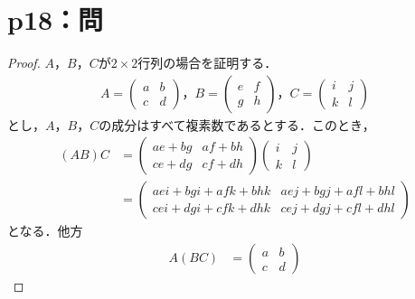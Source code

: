 \documentclass[a4paper,10pt,fleqn]{ltjsarticle}
\begin{document}
\section*{p18：問}

\begin{tleftbar}
    \begin{proof}
        $A$，$B$，$C$が$2 \times 2$行列の場合を証明する．
        \begin{gather*}
            A=
            \begin{pmatrix}
                a & b \\
                c & d
            \end{pmatrix}
            ，
            B=
            \begin{pmatrix}
                e & f \\
                g & h
            \end{pmatrix}
            ，C=
            \begin{pmatrix}
                i & j \\
                k & l
            \end{pmatrix}
        \end{gather*}
        とし，$A$，$B$，$C$の成分はすべて複素数であるとする．このとき，
        \begin{align*}
            (AB)C & =
            \begin{pmatrix}
                ae+bg & af+bh \\
                ce+dg & cf+dh
            \end{pmatrix}
            \begin{pmatrix}
                i & j \\
                k & l
            \end{pmatrix}
            \\
                  & =
            \begin{pmatrix}
                aei +bgi +afk +bhk & aej+bgj+afl+bhl     \\
                cei +dgi+cfk +dhk  & cej +dgj + cfl +dhl
            \end{pmatrix}
        \end{align*}
        となる．他方
        \begin{align*}
            A(BC) & =
            \begin{pmatrix}
                a & b \\
                c & d

\end{pmatrix}
\end{align*}
\end{proof}
\end{tleftbar}
\end{document}
